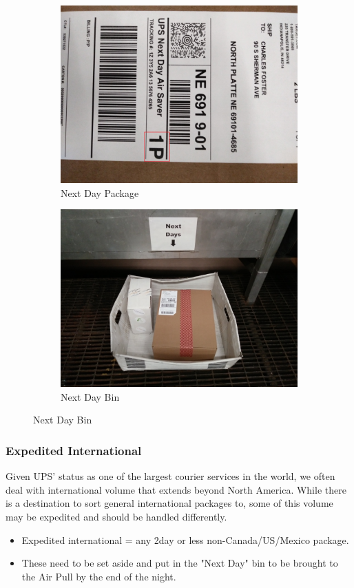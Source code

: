 \documentclass[12pt]{article}
\begin{document}
\begin{figure}[H]
\begin{subfigure}{0.5\textwidth}
\centering
\includegraphics[angle=90,width=0.7\linewidth]{20171221_160249} 
\caption{Next Day Package}
\end{subfigure}
\begin{subfigure}{0.5\textwidth}
\centering
\includegraphics[width=0.7\linewidth]{20171221_161216}
\caption{Next Day Bin}
\end{subfigure}
\end{figure}

\subsubsection{Expedited International}
Given UPS' status as one of the largest courier services in the world, we often deal with international volume that extends beyond North America. While there is a destination to sort general international packages to, some of this volume may be expedited and should be handled differently.
\begin{itemize}
    \item Expedited international = any 2day or less non-Canada/US/Mexico package.
    \item These need to be set aside and put in the "Next Day" bin to be brought to the Air Pull by the end of the night.
\end{itemize}
\end{document}
